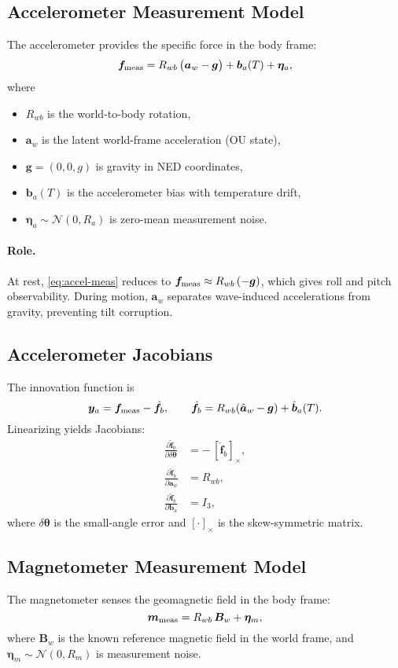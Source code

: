 \documentclass[10pt]{extarticle}
\begin{document}
\subsection{Accelerometer Measurement Model}
The accelerometer provides the specific force in the body frame:
\begin{equation}
\bm f_{\rm meas} 
= R_{wb}\,\big(\bm a_w - \bm g\big) + \bm b_a(T) + \bm\eta_a,
\label{eq:accel-meas}
\end{equation}
where
\begin{itemize}
\item $R_{wb}$ is the world-to-body rotation,
\item $\bm a_w$ is the latent world-frame acceleration (OU state),
\item $\bm g = (0,0,g)$ is gravity in NED coordinates,
\item $\bm b_a(T)$ is the accelerometer bias with temperature drift,
\item $\bm\eta_a \sim \mathcal{N}(0,R_a)$ is zero-mean measurement noise.
\end{itemize}

\paragraph{Role.}
At rest, \eqref{eq:accel-meas} reduces to $\bm f_{\rm meas} \approx R_{wb}\,(-\bm g)$,
which gives roll and pitch observability. During motion, $\bm a_w$ separates wave-induced
accelerations from gravity, preventing tilt corruption.

\subsection{Accelerometer Jacobians}
The innovation function is
\[
\bm y_a = \bm f_{\rm meas} - \hat{\bm f}_b,
\qquad
\hat{\bm f}_b = R_{wb}(\hat{\bm a}_w - \bm g) + \hat{\bm b}_a(T).
\]
Linearizing yields Jacobians:
\begin{align}
\frac{\partial \hat{\bm f}_b}{\partial \delta\bm\theta} &= -\,[\hat{\bm f}_b]_\times,
\label{eq:accel-jac-att}\\
\frac{\partial \hat{\bm f}_b}{\partial \bm a_w} &= R_{wb},
\label{eq:accel-jac-aw}\\
\frac{\partial \hat{\bm f}_b}{\partial \bm b_a} &= I_3,
\label{eq:accel-jac-bias}
\end{align}
where $\delta\bm\theta$ is the small-angle error and $[\cdot]_\times$ is the skew-symmetric matrix.

\subsection{Magnetometer Measurement Model}
The magnetometer senses the geomagnetic field in the body frame:
\begin{equation}
\bm m_{\rm meas} = R_{wb}\,\bm B_w + \bm\eta_m,
\label{eq:mag-meas}
\end{equation}
where $\bm B_w$ is the known reference magnetic field in the world frame,
and $\bm\eta_m \sim \mathcal{N}(0,R_m)$ is measurement noise.
\end{document}
